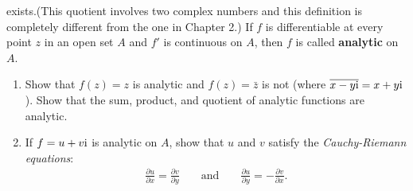 \begin{problems}
{        exists.(This quotient involves two complex numbers and this
        definition is completely different from the one in Chapter 2.)
        If $f$ is differentiable at every point $z$ in an open set $A$ and $f'$ is
        continuous on $A$, then $f$ is called \textbf{analytic} on $A$.
        \begin{enumerate}[label=(\alph*)]
            \item Show that $f(z)=z$ is analytic and $f(z)=\bar{z}$ is not (where $\overline{x-y\mathrm{i}} = x+y\mathrm{i}$).
                    Show that the sum, product, and quotient of analytic functions are analytic. 
            \item If $f=u+v\mathrm{i}$ is analytic on $A$, show that $u$ and $v$ satisfy the \textit{Cauchy-Riemann equations}:
                \begin{align*}
                    \frac{\partial u}{\partial x} = \frac{\partial v}{\partial y} 
                    && \text{ and } && 
                    \frac{\partial u}{\partial y} = -\frac{\partial v}{\partial x}.
                \end{align*}


\end{enumerate}}
\end{problems}
